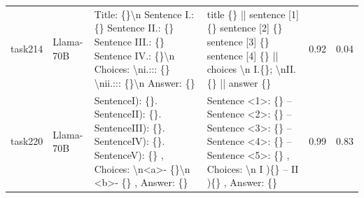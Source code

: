 \begin{longtable}{@{}p{0.8cm\tiny}p{1cm\tiny}p{4.1cm\ttfamily\tiny}p{4.1cm\ttfamily\tiny}p{0.8cm\tiny}p{0.8cm\tiny}@{}}
task214   & Llama-70B  & Title: \{\}\textbackslash{}n Sentence I.: \{\} Sentence II.: \{\} Sentence III.: \{\} Sentence IV.: \{\}\textbackslash{}n Choices:  \textbackslash{}ni.::: \{\} \textbackslash{}nii.::: \{\}\textbackslash{}n Answer: \{\}                                                                                                                                                                                                                                                                                              & title \{\} || sentence {[}1{]} \{\} sentence {[}2{]} \{\} sentence {[}3{]} \{\} sentence {[}4{]} \{\} || choices  \textbackslash{}n I.\{\}; \textbackslash{}nII.\{\} || answer \{\}                                                                                                                                                                                                                                                                                                                                                                                               & 0.92 & 0.04 \\
task220   & Llama-70B  & SentenceI): \{\}. SentenceII): \{\}. SentenceIII): \{\}. SentenceIV): \{\}. SentenceV): \{\} ,  Choices: \textbackslash{}n\textless{}a\textgreater{}- \{\}\textbackslash{}n \textless{}b\textgreater{}- \{\} ,  Answer: \{\}                                                                                                                                                                                                                                                                                            & Sentence  \textless{}1\textgreater{}: \{\} -- Sentence  \textless{}2\textgreater{}: \{\} -- Sentence  \textless{}3\textgreater{}: \{\} -- Sentence  \textless{}4\textgreater{}: \{\} -- Sentence  \textless{}5\textgreater{}: \{\} , Choices: \textbackslash{}n I )\{\} -- II )\{\} , Answer: \{\}                                                                                                                                                                                                                                                                                & 0.99 & 0.83 \\

\end{longtable}
